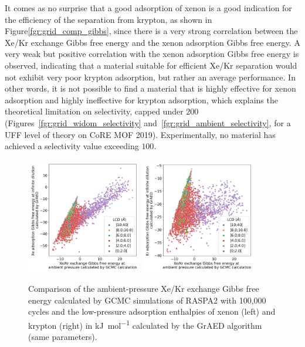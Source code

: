 \documentclass[main]{subfiles}
\begin{document}
It comes as no surprise that a good adsorption of xenon is a good indication for the efficiency of the separation from krypton, as shown in Figure\ref{fgr:grid_comp_gibbs}, since there is a very strong correlation between the Xe/Kr exchange Gibbs free energy and the xenon adsorption Gibbs free energy. A very weak but positive correlation with the xenon adsorption Gibbs free energy is observed, indicating that a material suitable for efficient Xe/Kr separation would not exhibit very poor krypton adsorption, but rather an average performance. In other words, it is not possible to find a material that is highly effective for xenon adsorption and highly ineffective for krypton adsorption, which explains the theoretical limitation on selectivity, capped under $200$ (Figures~\ref{fgr:grid_widom_selectivity} and~\ref{fgr:grid_ambient_selectivity}, for a UFF level of theory on CoRE MOF 2019). Experimentally, no material has achieved a selectivity value exceeding $100$.

\begin{figure}[ht]
  \centering
    \includegraphics[width=0.45\textwidth]{figures/3-fastsim/G_2080_vs_H_Xe_grid_overview.jpg}
    \hfill
    \includegraphics[width=0.45\textwidth]{figures/3-fastsim/G_2080_vs_H_Kr_grid_overview.jpg}
    \caption{Comparison of the ambient-pressure Xe/Kr exchange Gibbs free energy calculated by GCMC simulations of RASPA2 with 100,000 cycles and the low-pressure adsorption enthalpies of xenon (left) and krypton (right) in \si{\kilo\joule\per\mole} calculated by the GrAED algorithm (same parameters).}\label{fgr:grid_comp_enthalpy}
\end{figure}
\end{document}
